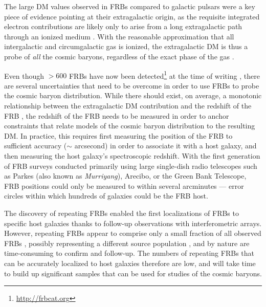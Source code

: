 \documentclass[twocolumn]{aastex63}
\begin{document}
\begin{CJK*}{UTF8}{gbsn}
 The large DM values observed in FRBs compared 
 to galactic pulsars \citep{manchester:2005} were a key piece of evidence pointing at their extragalactic origin, 
 as the requisite integrated electron
 contributions are likely only to arise 
 from a long extragalactic path through an ionized medium \citep{lorimer:2007}. %
With the reasonable approximation that all intergalactic and circumgalactic gas is ionized,
 the extragalactic DM is thus a probe of \textit{all} the cosmic baryons, regardless of
 the exact phase of the gas \citep{mcquinn:2014}.

Even though $> 600$ FRBs have now been detected\footnote{\url{http://frbcat.org}} at the time of writing \citep[e.g.,][]{petroff:2016,the-chime/frb-collaboration:2021}, there are 
several uncertainties that need to be overcome in order to use FRBs to probe the cosmic baryon distribution.
While there should exist, on average, a monotonic relationship between the extragalactic DM contribution and the redshift of the FRB
\citep{ioka:2003, inoue:2004, mcquinn:2014, pol:2019}, 
 the redshift of the FRB needs to be measured in order to anchor constraints that relate models of the cosmic baryon distribution
 to the resulting DM. In practice, this requires first measuring the position of the FRB to sufficient accuracy ($\sim$ arcsecond) in order
 to associate it with a host galaxy, and then measuring the host galaxy's spectroscopic redshift. 
 With the first generation of FRB surveys conducted primarily using large
 single-dish radio telescopes such as Parkes (also known as \emph{Murriyang}), Arecibo, or the Green Bank Telescope, FRB positions could only be measured to
 within several arcminutes --- error circles within which hundreds of galaxies could be the FRB host.
 
 The discovery of repeating FRBs \citep{spitler:2016} enabled 
 the first localizations of FRBs to specific host galaxies thanks to follow-up observations with interferometric arrays. 
 However, repeating FRBs appear to comprise only a small fraction of all observed FRBs \citep{chime/frb-collaboration:2019,james:2020}, 
 possibly representing a different source population \citep[e.g.,][]{hashimoto:2020, heintz:2020}, and by nature are time-consuming to confirm and follow-up.
 The numbers of repeating FRBs that can be accurately localized to host galaxies therefore are low, and will take time to build up significant samples that can be used
 for studies of the cosmic baryons.
 

\end{CJK*}
\end{document}
